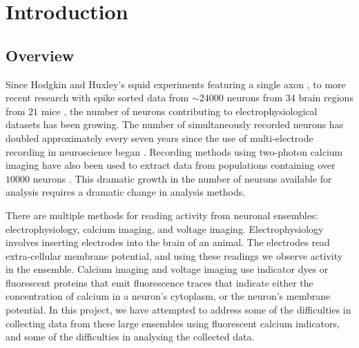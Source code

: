 \chapter{Introduction}

\label{chap:intro}

\section{Overview}

Since Hodgkin and Huxley's squid experiments featuring a single axon \parencite{hodgkin}, to more recent research with spike sorted data from  $\sim 24000$ neurons from $34$ brain regions from $21$ mice \parencite{allen}, the number of neurons contributing to electrophysiological datasets has been growing. The number of simultaneously recorded neurons has doubled approximately every seven years since the use of multi-electrode recording in neuroscience began \parencite{stevenson}. Recording methods using two-photon calcium imaging have also been used to extract data from populations containing over $10000$ neurons \parencite{peron}. This dramatic growth in the number of neurons available for analysis requires a dramatic change in analysis methods.

There are multiple methods for reading activity from neuronal ensembles: electrophysiology, calcium imaging, and voltage imaging. Electrophysiology involves inserting electrodes into the brain of an animal. The electrodes read extra-cellular membrane potential, and using these readings we observe activity in the ensemble. Calcium imaging and voltage imaging use indicator dyes or fluorescent proteins that emit fluorescence traces that indicate either the concentration of calcium in a neuron's cytoplasm, or the neuron's membrane potential. In this project, we have attempted to address some of the difficulties in collecting data from these large ensembles using fluorescent calcium indicators, and some of the difficulties in analysing the collected data.

